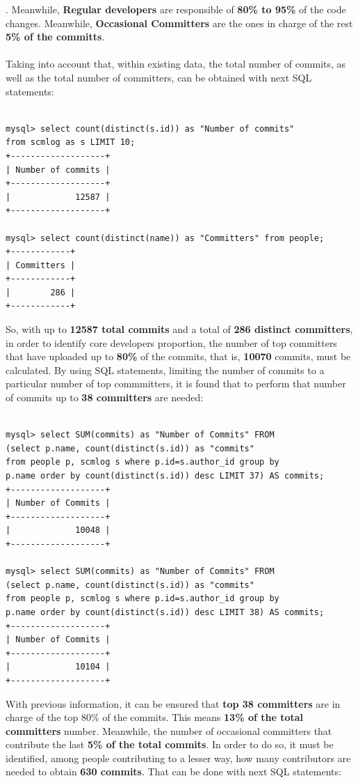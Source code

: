 \documentclass[a4paper, 12pt]{book}
\begin{document}
. Meanwhile, \textbf{Regular developers} are responsible of \textbf{80\% to 95\%} of the code changes. Meanwhile, \textbf{Occasional Committers} are the ones in charge of the rest \textbf{5\% of the committs}.\\
\\
Taking into account that, within existing data, the total number of commits, as well as the total number of committers, can be obtained with next SQL statements:

\begin{verbatim}

mysql> select count(distinct(s.id)) as "Number of commits"
from scmlog as s LIMIT 10;
+-------------------+
| Number of commits |
+-------------------+
|             12587 |
+-------------------+

mysql> select count(distinct(name)) as "Committers" from people;
+------------+
| Committers |
+------------+
|        286 |
+------------+

\end{verbatim}

So, with up to \textbf{12587 total commits} and a total of \textbf{286 distinct committers}, in order to identify core developers proportion, the number of top committers that have uploaded up to \textbf{80\%} of the commits, that is, \textbf{10070} commits, must be calculated. By using SQL statements, limiting the number of commits to a particular number of top commmitters, it is found that to perform that number of commits up to \textbf{38 committers} are needed:

\begin{verbatim}

mysql> select SUM(commits) as "Number of Commits" FROM
(select p.name, count(distinct(s.id)) as "commits"
from people p, scmlog s where p.id=s.author_id group by
p.name order by count(distinct(s.id)) desc LIMIT 37) AS commits;
+-------------------+
| Number of Commits |
+-------------------+
|             10048 |
+-------------------+

mysql> select SUM(commits) as "Number of Commits" FROM
(select p.name, count(distinct(s.id)) as "commits"
from people p, scmlog s where p.id=s.author_id group by
p.name order by count(distinct(s.id)) desc LIMIT 38) AS commits;
+-------------------+
| Number of Commits |
+-------------------+
|             10104 |
+-------------------+

\end{verbatim}
With previous information, it can be ensured that \textbf{top 38 committers} are in charge of the top 80\% of the commits. This means \textbf{13\% of the total committers} number. Meanwhile, the number of occasional committers that contribute the last \textbf{5\% of the total commits}. In order to do so, it must be identified, among people contributing to a lesser way, how many contributors are needed to obtain \textbf{630 commits}. That can be done with next SQL statements:
\end{document}
